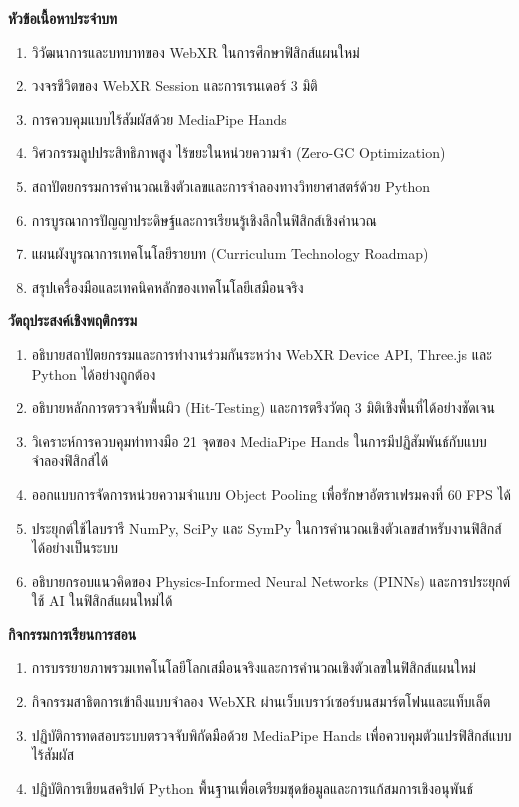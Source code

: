 \begin{lessonplanbox}
\noindent\textbf{หัวข้อเนื้อหาประจำบท}
\begin{enumerate}
    \item วิวัฒนาการและบทบาทของ WebXR ในการศึกษาฟิสิกส์แผนใหม่
    \item วงจรชีวิตของ WebXR Session และการเรนเดอร์ 3 มิติ
    \item การควบคุมแบบไร้สัมผัสด้วย MediaPipe Hands
    \item วิศวกรรมลูปประสิทธิภาพสูง ไร้ขยะในหน่วยความจำ (Zero-GC Optimization)
    \item สถาปัตยกรรมการคำนวณเชิงตัวเลขและการจำลองทางวิทยาศาสตร์ด้วย Python
    \item การบูรณาการปัญญาประดิษฐ์และการเรียนรู้เชิงลึกในฟิสิกส์เชิงคำนวณ
    \item แผนผังบูรณาการเทคโนโลยีรายบท (Curriculum Technology Roadmap)
    \item สรุปเครื่องมือและเทคนิคหลักของเทคโนโลยีเสมือนจริง
\end{enumerate}

\vspace{0.4em}
\noindent\textbf{วัตถุประสงค์เชิงพฤติกรรม}
\begin{enumerate}
    \item อธิบายสถาปัตยกรรมและการทำงานร่วมกันระหว่าง WebXR Device API, Three.js และ Python ได้อย่างถูกต้อง
    \item อธิบายหลักการตรวจจับพื้นผิว (Hit-Testing) และการตรึงวัตถุ 3 มิติเชิงพื้นที่ได้อย่างชัดเจน
    \item วิเคราะห์การควบคุมท่าทางมือ 21 จุดของ MediaPipe Hands ในการมีปฏิสัมพันธ์กับแบบจำลองฟิสิกส์ได้
    \item ออกแบบการจัดการหน่วยความจำแบบ Object Pooling เพื่อรักษาอัตราเฟรมคงที่ 60 FPS ได้
    \item ประยุกต์ใช้ไลบรารี NumPy, SciPy และ SymPy ในการคำนวณเชิงตัวเลขสำหรับงานฟิสิกส์ได้อย่างเป็นระบบ
    \item อธิบายกรอบแนวคิดของ Physics-Informed Neural Networks (PINNs) และการประยุกต์ใช้ AI ในฟิสิกส์แผนใหม่ได้
\end{enumerate}

\vspace{0.4em}
\noindent\textbf{กิจกรรมการเรียนการสอน}
\begin{enumerate}
    \item การบรรยายภาพรวมเทคโนโลยีโลกเสมือนจริงและการคำนวณเชิงตัวเลขในฟิสิกส์แผนใหม่
    \item กิจกรรมสาธิตการเข้าถึงแบบจำลอง WebXR ผ่านเว็บเบราว์เซอร์บนสมาร์ตโฟนและแท็บเล็ต
    \item ปฏิบัติการทดสอบระบบตรวจจับพิกัดมือด้วย MediaPipe Hands เพื่อควบคุมตัวแปรฟิสิกส์แบบไร้สัมผัส
    \item ปฏิบัติการเขียนสคริปต์ Python พื้นฐานเพื่อเตรียมชุดข้อมูลและการแก้สมการเชิงอนุพันธ์
\end{enumerate}


\end{lessonplanbox}
